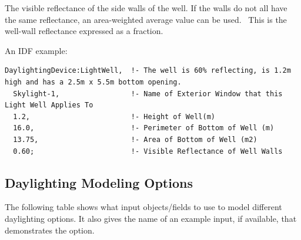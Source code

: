 The visible reflectance of the side walls of the well. If the walls do not all have the same reflectance, an area-weighted average value can be used.~ This is the well-wall reflectance expressed as a fraction.

An IDF example:

\begin{lstlisting}
DaylightingDevice:LightWell,  !- The well is 60% reflecting, is 1.2m high and has a 2.5m x 5.5m bottom opening.
  Skylight-1,                 !- Name of Exterior Window that this Light Well Applies To
  1.2,                        !- Height of Well(m)
  16.0,                       !- Perimeter of Bottom of Well (m)
  13.75,                      !- Area of Bottom of Well (m2)
  0.60;                       !- Visible Reflectance of Well Walls
\end{lstlisting}

\subsection{Daylighting Modeling Options}\label{daylighting-modeling-options}

The following table shows what input objects/fields to use to model different daylighting options. It also gives the name of an example input, if available, that demonstrates the option.

